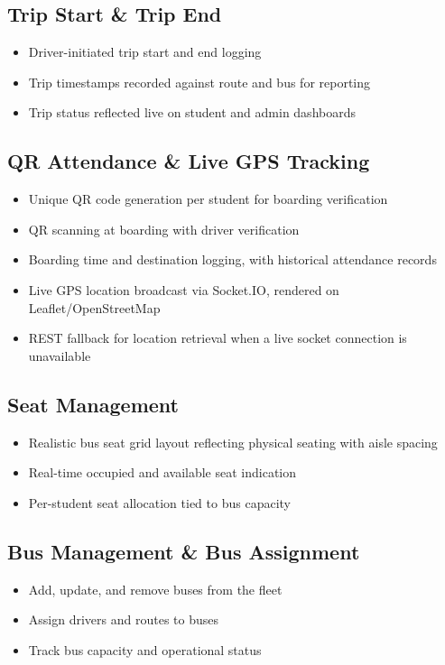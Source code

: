 \documentclass[11pt,a4paper]{report}
\begin{document}
\subsection{Trip Start \& Trip End}
\begin{itemize}[leftmargin=1.3em]
  \item Driver-initiated trip start and end logging
  \item Trip timestamps recorded against route and bus for reporting
  \item Trip status reflected live on student and admin dashboards
\end{itemize}

\subsection{QR Attendance \& Live GPS Tracking}
\begin{itemize}[leftmargin=1.3em]
  \item Unique QR code generation per student for boarding verification
  \item QR scanning at boarding with driver verification
  \item Boarding time and destination logging, with historical attendance records
  \item Live GPS location broadcast via Socket.IO, rendered on Leaflet/OpenStreetMap
  \item REST fallback for location retrieval when a live socket connection is unavailable
\end{itemize}

\subsection{Seat Management}
\begin{itemize}[leftmargin=1.3em]
  \item Realistic bus seat grid layout reflecting physical seating with aisle spacing
  \item Real-time occupied and available seat indication
  \item Per-student seat allocation tied to bus capacity
\end{itemize}

\subsection{Bus Management \& Bus Assignment}
\begin{itemize}[leftmargin=1.3em]
  \item Add, update, and remove buses from the fleet
  \item Assign drivers and routes to buses
  \item Track bus capacity and operational status
\end{itemize}
\end{document}
